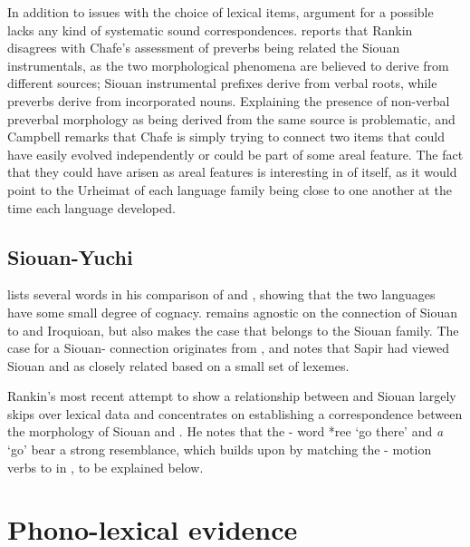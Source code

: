 \documentclass[output=paper]{LSP/langsci}
\begin{document}
In addition to issues with the choice of lexical items,  argument for a possible  lacks any kind of systematic sound correspondences. \citet{Campbell2000} reports that Rankin disagrees with Chafe's assessment of  preverbs being related the Siouan instrumentals, as the two morphological phenomena are believed to derive from different sources; Siouan instrumental prefixes derive from verbal roots, while  preverbs derive from incorporated nouns. Explaining the presence of non-verbal preverbal morphology as being derived from the same source is problematic, and Campbell remarks that Chafe is simply trying to connect two items that could have easily evolved independently or could be part of some areal feature. The fact that they could have arisen as areal features is interesting in of itself, as it would point to the Urheimat of each language family being close to one another at the time each language developed.

\subsection{Siouan-Yuchi}

\citet{Carter1980} lists several  words in his comparison of  and , showing that the two languages have some small degree of cognacy. \citet{Rankin1996,Rankin1998scy} remains agnostic on the connection of Siouan to  and Iroquioan, but also makes the case that  belongs to the Siouan family. The case for a Siouan- connection originates from \citet{Sapir1929}, and \citet{Haas1952} notes that Sapir had viewed Siouan and  as closely related based on a small set of lexemes.

Rankin's \citeyear{Rankin1998scy} most recent attempt to show a relationship between  and Siouan largely skips over lexical data and concentrates on establishing a correspondence between the morphology of Siouan and . He notes that the - word *ree `go there' and  \emph{\textbeltl a} `go' bear a strong resemblance, which \citet{Kasak2012,Kasak2013} builds upon by matching the - motion verbs to  in , to be explained below.

\section{Phono-lexical evidence}\label{sec:kasak:4}
\end{document}
